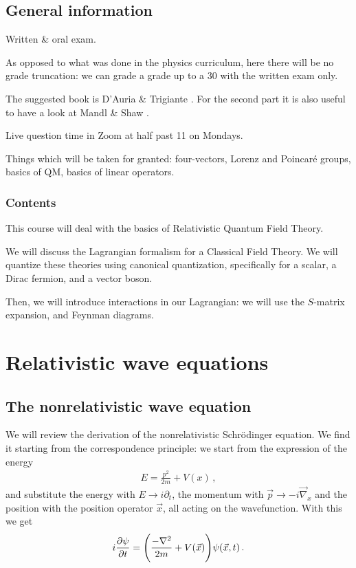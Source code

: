 \documentclass[main.tex]{subfiles}
\begin{document}

\section*{General information}

Written \& oral exam. 

As opposed to what was done in the physics curriculum, here there will be no grade truncation: we can grade a grade up to a 30 with the written exam only.

The suggested book is D'Auria \& Trigiante \cite{dauriaSpecialRelativityFeynman2011}. 
For the second part it is also useful to have a look at Mandl \& Shaw \cite{mandlQuantumFieldTheory2010}.


Live question time in Zoom at half past 11 on Mondays. 

Things which will be taken for granted: four-vectors, Lorenz and Poincaré groups, basics of QM, basics of linear operators. 

\subsection*{Contents}

This course will deal with the basics of Relativistic Quantum Field Theory. 

We will discuss the Lagrangian formalism for a Classical Field Theory. 
We will quantize these theories using canonical quantization, specifically for a scalar, a Dirac fermion, and a vector boson. 

Then, we will introduce interactions in our Lagrangian: we will use the \(S\)-matrix expansion, and Feynman diagrams. 

\chapter{Relativistic wave equations}

\section{The nonrelativistic wave equation}

We will review the derivation of the nonrelativistic Schrödinger equation. 
We find it starting from the correspondence principle: we start from the expression of the energy 
%
\begin{align}
E = \frac{p^2}{2m} + V(x)
\,,
\end{align}
%
and substitute the energy with \(E \rightarrow i \partial_{t}\), the momentum with \(\vec{p} \rightarrow - i \vec{\nabla}_{x}\) and the position with the position operator \(\vec{x}\), all acting on the wavefunction.
With this we get 
%
\begin{align}
i \pdv{\psi }{t} (\vec{x}, t)
= \qty(\frac{-\nabla^2 }{2m}+  V(\vec{x})) \psi (\vec{x}, t) 
\,.
\end{align}
%
\end{document}
